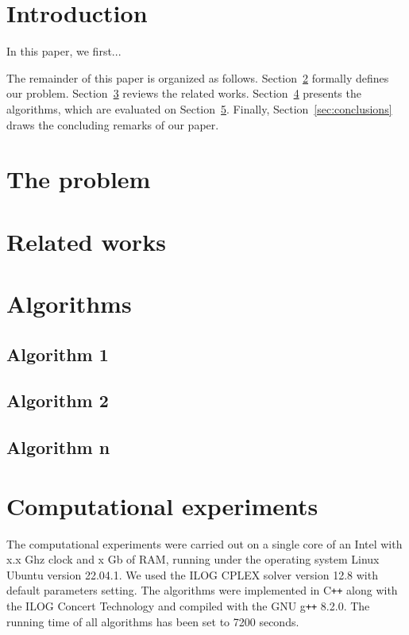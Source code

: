 \section{Introduction} \label{sec:intro}

In this paper, we first...

The remainder of this paper is organized as follows.
Section~\ref{sec:problem} formally defines our problem.
Section~\ref{sec:related} reviews the related works.
Section~\ref{sec:algorithms} presents the algorithms, which are evaluated on Section~\ref{sec:experiments}. Finally, Section~\ref{sec:conclusions} draws the concluding remarks of our paper.

\section{The problem} \label{sec:problem}


\section{Related works} \label{sec:related}


\section{Algorithms} \label{sec:algorithms}

\subsection{Algorithm 1}

\subsection{Algorithm 2}

\subsection{Algorithm n}


\section{Computational experiments} \label{sec:experiments}

The computational experiments were carried out on a single core of an Intel
with x.x Ghz clock and x Gb of RAM,
running under the operating system  Linux  Ubuntu version 22.04.1.
We used the ILOG  CPLEX  solver version  12.8  with default parameters setting. 
The algorithms were implemented in C{}\verb!++! along with the ILOG Concert Technology and compiled with the GNU g{}\verb!++! 8.2.0. 
The running time of all algorithms has been set to 7200 seconds.


